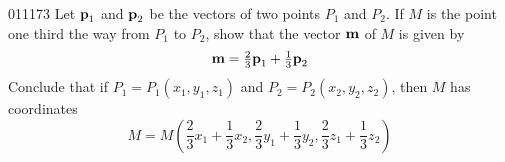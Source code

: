 \begin{example}{}{011173}
Let $\textbf{p}_{1}$ and $\textbf{p}_{2}$ be the vectors of two points $P_{1}$ and $P_{2}$. If $M$ is the point one third the way from $P_{1}$ to $P_{2}$, show that the vector $\textbf{m}$ of $M$ is given by
\begin{equation*}
\textbf{m} = \tfrac{2}{3}\textbf{p}_{1} + \tfrac{1}{3}\textbf{p}_{2}
\end{equation*}
Conclude that if $P_{1} = P_{1}(x_{1}, y_{1}, z_{1})$ and $P_{2} = P_{2}(x_{2}, y_{2}, z_{2})$, then $M$ has coordinates
\begin{equation*}
M = M\left(\frac{2}{3}x_{1} + \frac{1}{3}x_{2}, \frac{2}{3}y_{1} + \frac{1}{3}y_{2}, \frac{2}{3}z_{1} + \frac{1}{3}z_{2}\right)
\end{equation*}

\begin{wrapfigure}{l}{4cm} 

\end{wrapfigure}


\end{example}
